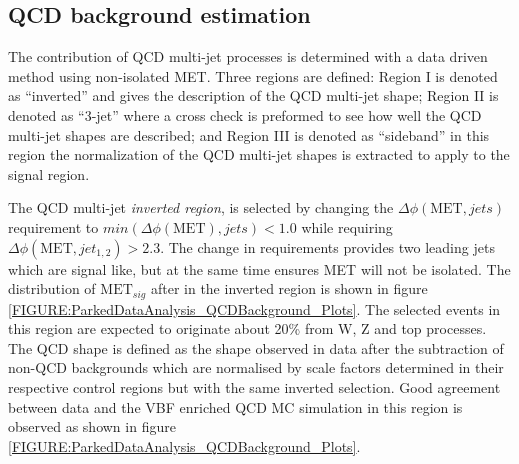 \subsection{QCD background estimation}
\label{SECTION:ParkedDataAnalysis_ControlRegions_QCDBackground}


The contribution of \gls{QCD} multi-jet processes is determined with a data driven method using non-isolated \gls{MET}. Three regions are defined: Region I is denoted as ``inverted'' and gives the description of the \gls{QCD} multi-jet shape; Region II is denoted as ``3-jet'' where a cross check is preformed to see how well the \gls{QCD} multi-jet shapes are described; and Region III is denoted as ``sideband'' in this region the normalization of the \gls{QCD} multi-jet shapes is extracted to apply to the signal region.

The \gls{QCD} multi-jet \textit{inverted region}, is selected by changing the $\Delta\phi(\text{MET},jets)$ requirement to $min(\Delta\phi(\text{MET}),jets)<1.0$ while requiring $\Delta\phi(\text{MET},jet_{1,2})>2.3$. The change in requirements provides two leading jets which are signal like, but at the same time ensures \gls{MET} will not be isolated. The distribution of $\text{MET}_{sig}$ after in the inverted region is shown in figure \ref{FIGURE:ParkedDataAnalysis_QCDBackground_Plots}. The selected events in this region are expected to originate about 20\% from W, Z and top processes. The \gls{QCD} shape is defined as the shape observed in data after the subtraction of non-\gls{QCD} backgrounds which are normalised by scale factors determined in their respective control regions but with the same inverted selection. Good agreement between data and the \gls{VBF} enriched \gls{QCD} \gls{MC} simulation in this region is observed as shown in figure \ref{FIGURE:ParkedDataAnalysis_QCDBackground_Plots}.

